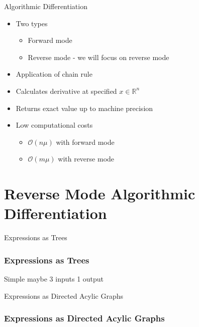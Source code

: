 \documentclass{beamer}
\begin{document}
\begin{frame}{Algorithmic Differentiation}
    \begin{itemize}
        \item Two types
            \begin{itemize}
                \item Forward mode
                \item Reverse mode - we will focus on reverse mode
            \end{itemize}
        \item Application of chain rule
        \item Calculates derivative at specified $x \in \mathbb{R}^n$
        \item Returns \alert{exact} value up to machine precision
        \item Low computational costs
            \begin{itemize}
                \item $\mathcal{O}(n \mu)$ with forward mode
                \item $\mathcal{O}(m \mu)$ with reverse mode
            \end{itemize}
    \end{itemize}
\end{frame}


\section{Reverse Mode Algorithmic Differentiation}

\begin{frame}{Expressions as Trees}
\frametitle{Expressions as Trees}
Simple maybe 3 inputs 1 output
\end{frame}

\begin{frame}{Expressions as Directed Acylic Graphs}
    \frametitle{Expressions as Directed Acylic Graphs}
\end{frame}
\end{document}
